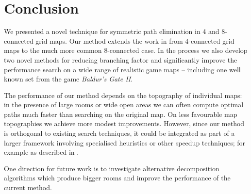 \section{Conclusion}
We presented a novel technique for symmetric path elimination in 4 and 8-connected grid maps.
Our method extends the work in \cite{harabor10} from 4-connected grid maps to the much more common
8-connected case.
In the process we also develop two novel methods for reducing branching factor and significantly
improve the performance search on a wide range of realistic game maps -- including one well known 
set from the game \emph{Baldur's Gate II}. 
\par
The performance of our method depends on the topography of individual maps: 
in the presence of large rooms or wide open areas we can often compute optimal paths much faster 
than searching on the original map. 
On less favourable map topographies we achieve more modest improvements.
However, since our method is orthogonal to existing search techniques, it could be integrated
as part of a larger framework involving specialised heuristics or other speedup techniques; 
for example as described in \cite{botea04,bjornsson05,bjornsson06}. 
\par
One direction for future work is to investigate alternative decomposition
algorithms which produce bigger rooms and improve the performance of the current
method.
